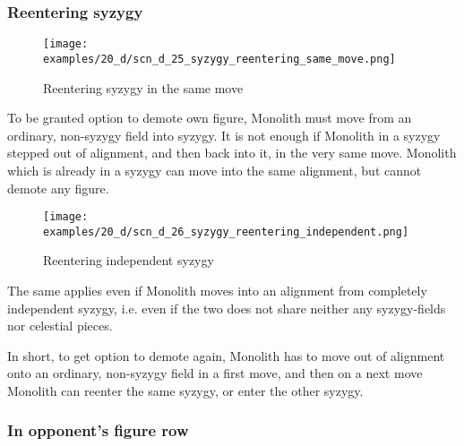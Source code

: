 \clearpage %

\subsubsection*{Reentering syzygy}
\label{sec:Discovery/Monolith/Syzygy/Reentering syzygy}

\vspace*{-1.4\baselineskip}
\noindent
\begin{figure}[!h]
\texttt{[image: examples/20\_d/scn\_d\_25\_syzygy\_reentering\_same\_move.png]}
\caption{Reentering syzygy in the same move}
\label{fig:scn_d_25_syzygy_reentering_same_move}
\end{figure}

To be granted option to demote own figure, Monolith must move from an ordinary,
non-syzygy field into syzygy. It is not enough if Monolith in a syzygy stepped
out of alignment, and then back into it, in the very same move. Monolith which
is already in a syzygy can move into the same alignment, but cannot demote any
figure.

\clearpage %

\noindent
\begin{figure}[!h]
\texttt{[image: examples/20\_d/scn\_d\_26\_syzygy\_reentering\_independent.png]}
\caption{Reentering independent syzygy}
\label{fig:scn_d_26_syzygy_reentering_independent}
\end{figure}

The same applies even if Monolith moves into an alignment from completely independent
syzygy, i.e. even if the two does not share neither any syzygy-fields nor celestial
pieces.

In short, to get option to demote again, Monolith has to move out of alignment onto
an ordinary, non-syzygy field in a first move, and then on a next move Monolith can
reenter the same syzygy, or enter the other syzygy.

\clearpage %

\subsubsection*{In opponent's figure row}
\label{sec:Discovery/Monolith/Syzygy/In opponent's figure row}

